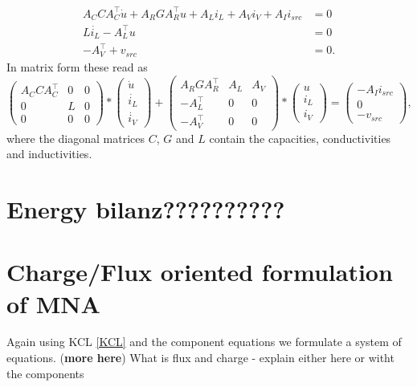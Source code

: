 \begin{displaymath}
	\begin{aligned}
		A_C C A_C^\top \dot{u} + A_R G A_R^\top u + A_L i_L + A_V i_V + A_I i_{src} &= 0 \\
		L \dot{i_L}	- A_L^\top u &= 0 \\
		-A_V^\top + v_{src} &= 0.
	\end{aligned}	
\end{displaymath}
In matrix form these read as
\begin{displaymath}
	\begin{pmatrix}
		A_C C A_C^\top & 0 & 0 \\
		0 & L & 0 \\
		0 & 0 & 0
	\end{pmatrix}
	*
	\begin{pmatrix}
		\dot{u} \\
		\dot{i_L} \\
		\dot{i_V}
	\end{pmatrix}
	+
	\begin{pmatrix}
		A_R G A_R^\top & A_L & A_V \\
		-A_L^\top & 0 & 0 \\
		-A_V^\top & 0 & 0 
	\end{pmatrix}
	*
	\begin{pmatrix}
		u \\
		i_L \\
		i_V
	\end{pmatrix}
	=
	\begin{pmatrix}
		-A_I i_{src} \\
		0 \\
		-v_{src}
	\end{pmatrix} , 
\end{displaymath}
where the diagonal matrices $C$, $G$ and $L$ contain the capacities, conductivities and inductivities.

\section{Energy \textbf{bilanz??????????}}

\section{Charge/Flux oriented formulation of MNA}
Again using KCL \ref{KCL} and the component equations we formulate a system of equations. (\textbf{more here}) What is flux and charge - explain either here or witht the components

